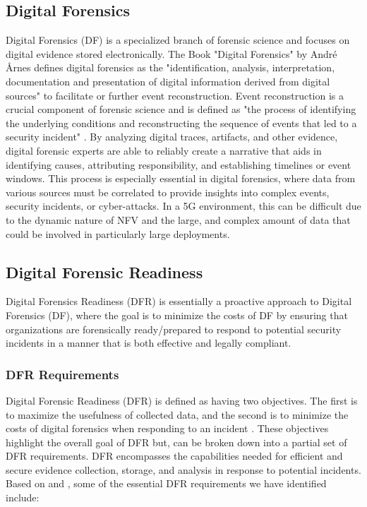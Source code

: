 \documentclass[final,1p,times,authoryear]{elsarticle}
\begin{document}
\subsection{Digital Forensics}
\label{sub2sec1}
Digital Forensics (DF) is a specialized branch of forensic science and focuses on digital evidence stored electronically. The Book "Digital Forensics" by Andr\'{e} \AA rnes \citep{aarnes2017digital} defines digital forensics as the "identification, analysis, interpretation, documentation and presentation of digital information derived from digital sources" to facilitate or further event reconstruction. Event reconstruction is a crucial component of forensic science and is defined as "the process of identifying the underlying conditions and reconstructing the sequence of events that led to a security incident" \citep{jeyaraman2006empirical}. By analyzing digital traces, artifacts, and other evidence, digital forensic experts are able to reliably create a narrative that aids in identifying causes, attributing responsibility, and establishing timelines or event windows. This process is especially essential in digital forensics, where data from various sources must be correlated to provide insights into complex events, security incidents, or cyber-attacks. In a 5G environment, this can be difficult due to the dynamic nature of NFV and the large, and complex amount of data that could be involved in particularly large deployments.

\subsection{Digital Forensic Readiness}
\label{sub2sec2}
Digital Forensics Readiness (DFR) is essentially a proactive approach to Digital Forensics (DF), where the goal is to minimize the costs of DF by ensuring that organizations are forensically ready/prepared to respond to potential security incidents in a manner that is both effective and legally compliant.

\subsubsection{DFR Requirements}
\label{sub2sub2sec1}
Digital Forensic Readiness (DFR) is defined as having two objectives. The first is to maximize the usefulness of collected data, and the second is to minimize the costs of digital forensics when responding to an incident \citep{tan2001forensic}. These objectives highlight the overall goal of DFR but, can be broken down into a partial set of DFR requirements. DFR encompasses the capabilities needed for efficient and secure evidence collection, storage, and analysis in response to potential incidents. Based on \citep{tan2001forensic} and \citep{9089494}, some of the essential DFR requirements we have identified include:
\end{document}
